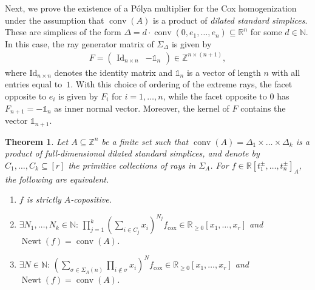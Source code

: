\documentclass[a4paper,11pt]{amsart}
\newtheorem{theorem}{Theorem}[section]
\theoremstyle{definition}
\DeclareMathOperator{\conv}{conv}
\DeclareMathOperator{\Newt}{Newt}
\newcommand{\ZZ}{\mathbb{Z}}
\newcommand{\NN}{\mathbb{N}}
\newcommand{\RR}{\mathbb{R}}
\newcommand{\cox}{\mathrm{cox}}
\begin{document}
Next, we prove the existence of a Pólya multiplier for the Cox homogenization under the assumption that $\conv(A)$ is a product of \emph{dilated standard simplices}. These are simplices of the form $\Delta = d \cdot \conv(0,e_1,\dots,e_{n})\subseteq \RR^n$ for some $d \in \NN$.
In this case, the ray generator matrix of $\Sigma_{\Delta}$ is given by
\begin{align}
\label{Eq:RayGenDilated}
    F = \begin{pmatrix}
       \mathrm{Id}_{n\times n}    &  -\mathds{1}_{n}    \end{pmatrix} \in \ZZ^{n \times (n +1)},
\end{align}
where $\mathrm{Id}_{n\times n}$ denotes the identity matrix and $\mathds{1}_{n}$ is a vector of length $n$ with all entries equal to~$1$.
With this choice of ordering of the extreme rays, the facet opposite to $e_i$ is given by $F_i$ for $i=1,\dots,n$, while the facet opposite to $0$ has $F_{n+1} =  -\mathds{1}_{n}$ as inner normal vector. 
Moreover, the kernel of $F$ contains the vector $\mathds{1}_{n+1}$.

\begin{theorem}
\label{prop:polyaInCox_standard}
   Let $A \subseteq \ZZ^n$ be a finite set such that $\conv(A) = \Delta_1 \times \dots \times \Delta_k$ is a product of full-dimensional dilated standard simplices, and denote by $C_1,\dots,C_k \subseteq [r]$ the primitive collections of rays in $\Sigma_A$. For $f\in \RR[t_1^{\pm},\ldots,t_n^{\pm}]_A$, the following are equivalent.
\begin{enumerate}
    \item[(i)] $f$ is strictly $A$-copositive.
    \item[(ii)]  $\exists N_1,\ldots,N_k\in \NN\colon\,\prod_{j=1}^k\left(\sum_{i\in C_j}x_i\right)^{N_j }f_\cox \in \RR_{\geq0}[x_1,\dots,x_r]$ and $\Newt(f) = \conv(A)$.
    \item[(iii)] $\exists N\in \NN\colon \, \left(  \sum_{\sigma \in \Sigma_A(n)} \prod_{i \notin \sigma} x_i  \right)^N f_\cox  \in \RR_{\geq0}[x_1,\dots,x_r]$ and $\Newt(f) = \conv(A)$.
\end{enumerate}
\end{theorem}
\end{document}
